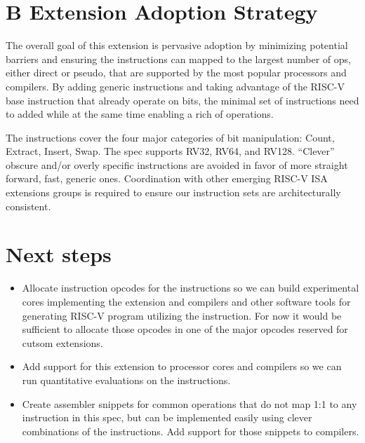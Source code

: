 \section{B Extension Adoption Strategy}

The overall goal of this extension is pervasive adoption by minimizing
potential barriers and ensuring the instructions can mapped to the
largest number of ops, either direct or pseudo, that are supported by
the most popular processors and compilers. By adding generic
instructions and taking advantage of the RISC-V base instruction that
already operate on bits, the minimal set of instructions need to added
while at the same time enabling a rich of operations.

The instructions cover the four major categories of bit manipulation: Count,
Extract, Insert, Swap. The spec supports RV32, RV64, and RV128. ``Clever''
obscure and/or overly specific instructions are avoided in favor of more
straight forward, fast, generic ones.  Coordination with other emerging RISC-V
ISA extensions groups is required to ensure our instruction sets are
architecturally consistent.

\section{Next steps}

\begin{itemize}
\item
  Allocate instruction opcodes for the instructions so we can build
  experimental cores implementing the extension and compilers and other
  software tools for generating RISC-V program utilizing the instruction.
  For now it would be sufficient to allocate those opcodes in one of the
  major opcodes reserved for cutsom extensions.
\item
  Add support for this extension to processor cores and compilers
  so we can run quantitative evaluations on the instructions.
\item
  Create assembler snippets for common operations that do not map 1:1
  to any instruction in this spec, but can be implemented easily using
  clever combinations of the instructions. Add support for those snippets
  to compilers.
\end{itemize}


